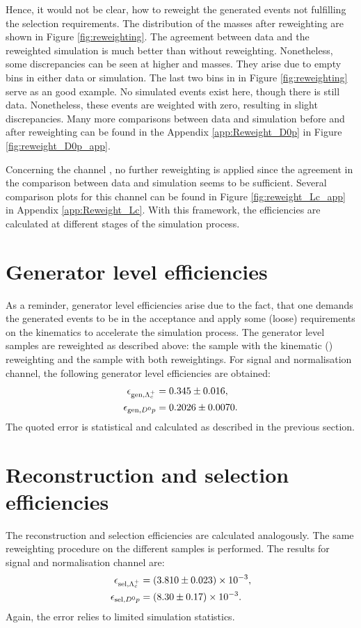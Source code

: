 Hence, it would not be clear, how to reweight the generated events not fulfilling the selection requirements. 
The distribution of the masses after reweighting are shown in Figure \ref{fig:reweighting}.
The agreement between data and the reweighted simulation is much better than without reweighting.
Nonetheless, some discrepancies can be seen at higher \Dz\mun and \Dz\proton\mun masses.
They arise due to empty bins in either data or simulation.
The last two bins in \MDmu in Figure \ref{fig:reweighting} serve as an good example.
No simulated events exist here, though there is still data.
Nonetheless, these events are weighted with zero, resulting in slight discrepancies.
Many more comparisons between data and simulation before and after reweighting can be found in the Appendix \ref{app:Reweight_D0p} in Figure \ref{fig:reweight_D0p_app}.

Concerning the channel \LbToLcmunu, no further reweighting is applied since the agreement in the comparison between data and simulation seems to be sufficient.
Several comparison plots for this channel can be found in Figure \ref{fig:reweight_Lc_app} in Appendix \ref{app:Reweight_Lc}.
With this framework, the efficiencies are calculated at different stages of the simulation process.

\section{Generator level efficiencies}
As a reminder, generator level efficiencies arise due to the fact, that one demands the generated events to be in the \lhcb acceptance and apply some (loose) requirements on the kinematics to accelerate the simulation process.
The generator level samples are reweighted as described above: the \LbToLcmunu sample with the kinematic \pt(\Lb) reweighting and the \LbToDpmunu sample with both reweightings.
For signal and normalisation channel, the following generator level efficiencies are obtained:
\begin{align*}
    \effGenLc &= \effGenLcval \pm \effGenLcerr, \\
    \effGenDp &= \effGenDpval \pm \effGenDperr.
\end{align*}
The quoted error is statistical and calculated as described in the previous section.


\section{Reconstruction and selection efficiencies}
The reconstruction and selection efficiencies are calculated analogously.
The same reweighting procedure on the different samples is performed.
The results for signal and normalisation channel are:
\begin{align*}
    \effSelLc &= \num[scientific-notation=true]{\effSelLcval \pm \effSelLcerr}, \\
    \effSelDp &= \num[scientific-notation=true]{\effSelDpval \pm \effSelDperr}.
\end{align*}
Again, the error relies to limited simulation statistics.

